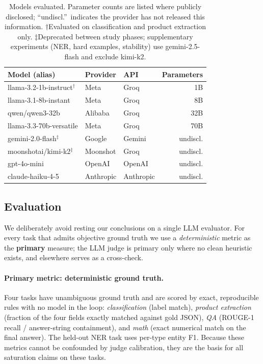 \begin{table}[t]
\centering
\caption{Models evaluated. Parameter counts are listed where publicly
  disclosed; ``undiscl.''\ indicates the provider has not released this
  information. $\dagger$Evaluated on classification and product extraction
  only. $\ddagger$Deprecated between study phases; supplementary
  experiments (NER, hard examples, stability) use gemini-2.5-flash and
  exclude kimi-k2.}
\label{tab:models}
\small
\begin{tabular}{lllr}
\toprule
Model (alias) & Provider & API & Parameters \\
\midrule
llama-3.2-1b-instruct$^\dagger$ & Meta & Groq     & 1B        \\
llama-3.1-8b-instant    & Meta       & Groq      & 8B        \\
qwen/qwen3-32b          & Alibaba    & Groq      & 32B       \\
llama-3.3-70b-versatile & Meta       & Groq      & 70B       \\
gemini-2.0-flash$^\ddagger$ & Google  & Gemini    & undiscl.  \\
moonshotai/kimi-k2$^\ddagger$ & Moonshot & Groq   & undiscl.  \\
gpt-4o-mini             & OpenAI     & OpenAI    & undiscl.  \\
claude-haiku-4-5        & Anthropic  & Anthropic & undiscl.  \\
\bottomrule
\end{tabular}
\end{table}

\subsection{Evaluation}
\label{sec:eval}

We deliberately avoid resting our conclusions on a single LLM evaluator.
For every task that admits objective ground truth we use a \emph{deterministic}
metric as the \textbf{primary} measure; the LLM judge is primary only where no
clean heuristic exists, and elsewhere serves as a cross-check.

\paragraph{Primary metric: deterministic ground truth.}
Four tasks have unambiguous ground truth and are scored by exact, reproducible
rules with no model in the loop: \emph{classification} (label match),
\emph{product extraction} (fraction of the four fields exactly matched against
gold JSON), \emph{QA} (ROUGE-1 recall / answer-string containment), and
\emph{math} (exact numerical match on the final answer).
The held-out NER task uses per-type entity F1.
Because these metrics cannot be confounded by judge calibration, they are the
basis for all saturation claims on these tasks.

